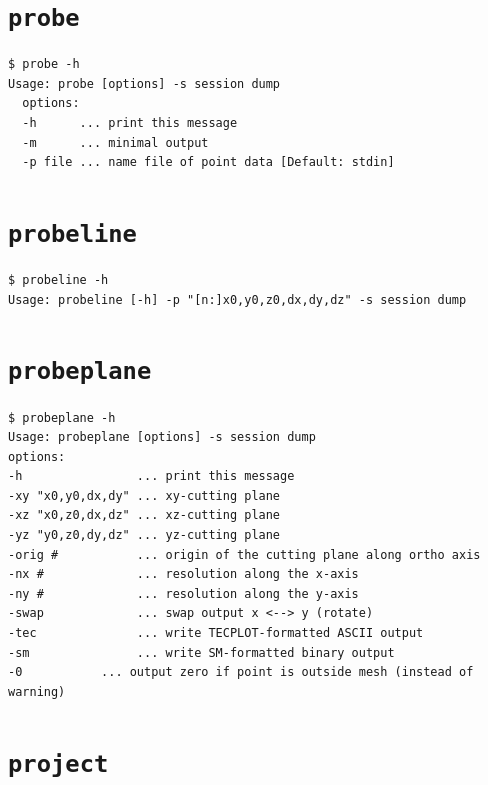 \documentclass[11pt]{report}
\begin{document}
\section{\texttt{probe}}
\label{sec.probe}

{\small
\begin{verbatim}
$ probe -h
Usage: probe [options] -s session dump
  options:
  -h      ... print this message
  -m      ... minimal output
  -p file ... name file of point data [Default: stdin]
\end{verbatim}
}
%

\section{\texttt{probeline}}
\label{sec.probeline}

{\small
\begin{verbatim}
$ probeline -h
Usage: probeline [-h] -p "[n:]x0,y0,z0,dx,dy,dz" -s session dump
\end{verbatim}
}
%

\section{\texttt{probeplane}}
\label{sec.probeplane}

{\small
\begin{verbatim}
$ probeplane -h
Usage: probeplane [options] -s session dump
options:
-h                ... print this message
-xy "x0,y0,dx,dy" ... xy-cutting plane
-xz "x0,z0,dx,dz" ... xz-cutting plane
-yz "y0,z0,dy,dz" ... yz-cutting plane
-orig #           ... origin of the cutting plane along ortho axis
-nx #             ... resolution along the x-axis
-ny #             ... resolution along the y-axis
-swap             ... swap output x <--> y (rotate)
-tec              ... write TECPLOT-formatted ASCII output
-sm               ... write SM-formatted binary output
-0	         ... output zero if point is outside mesh (instead of warning)
\end{verbatim}
}
%

\section{\texttt{project}}
\label{sec.project}
\end{document}
